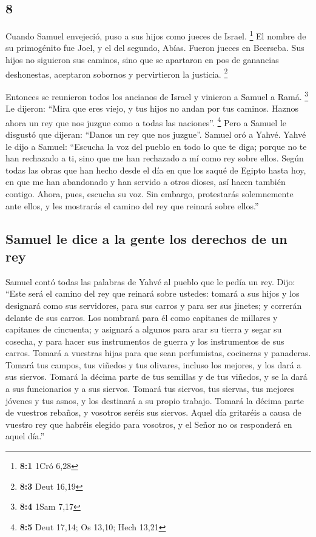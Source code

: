 \begin{paracol}{2}
\hypertarget{section-14}{%
\section{8}\label{section-14}}

 Cuando Samuel envejeció, puso a sus hijos como jueces de
Israel. \footnote{\textbf{8:1} 1Cró 6,28}  El nombre de su
primogénito fue Joel, y el del segundo, Abías. Fueron jueces en
Beerseba.  Sus hijos no siguieron sus caminos, sino que se
apartaron en pos de ganancias deshonestas, aceptaron sobornos y
pervirtieron la justicia. \footnote{\textbf{8:3} Deut 16,19}

 Entonces se reunieron todos los ancianos de Israel y
vinieron a Samuel a Ramá. \footnote{\textbf{8:4} 1Sam 7,17}
 Le dijeron: ``Mira que eres viejo, y tus hijos no andan
por tus caminos. Haznos ahora un rey que nos juzgue como a todas las
naciones''. \footnote{\textbf{8:5} Deut 17,14; Os 13,10; Hech 13,21}
 Pero a Samuel le disgustó que dijeran: ``Danos un rey que
nos juzgue''. Samuel oró a Yahvé.  Yahvé le dijo a Samuel:
``Escucha la voz del pueblo en todo lo que te diga; porque no te han
rechazado a ti, sino que me han rechazado a mí como rey sobre ellos.
 Según todas las obras que han hecho desde el día en que
los saqué de Egipto hasta hoy, en que me han abandonado y han servido a
otros dioses, así hacen también contigo.  Ahora, pues,
escucha su voz. Sin embargo, protestarás solemnemente ante ellos, y les
mostrarás el camino del rey que reinará sobre ellos.''

\hypertarget{samuel-le-dice-a-la-gente-los-derechos-de-un-rey}{%
\subsection{Samuel le dice a la gente los derechos de un
rey}\label{samuel-le-dice-a-la-gente-los-derechos-de-un-rey}}

 Samuel contó todas las palabras de Yahvé al pueblo que
le pedía un rey.  Dijo: ``Este será el camino del rey que
reinará sobre ustedes: tomará a sus hijos y los designará como sus
servidores, para sus carros y para ser sus jinetes; y correrán delante
de sus carros.  Los nombrará para él como capitanes de
millares y capitanes de cincuenta; y asignará a algunos para arar su
tierra y segar su cosecha, y para hacer sus instrumentos de guerra y los
instrumentos de sus carros.  Tomará a vuestras hijas para
que sean perfumistas, cocineras y panaderas.  Tomará tus
campos, tus viñedos y tus olivares, incluso los mejores, y los dará a
sus siervos.  Tomará la décima parte de tus semillas y de
tus viñedos, y se la dará a sus funcionarios y a sus siervos.
 Tomará tus siervos, tus siervas, tus mejores jóvenes y
tus asnos, y los destinará a su propio trabajo.  Tomará
la décima parte de vuestros rebaños, y vosotros seréis sus siervos.
 Aquel día gritaréis a causa de vuestro rey que habréis
elegido para vosotros, y el Señor no os responderá en aquel día.''


\end{paracol}
